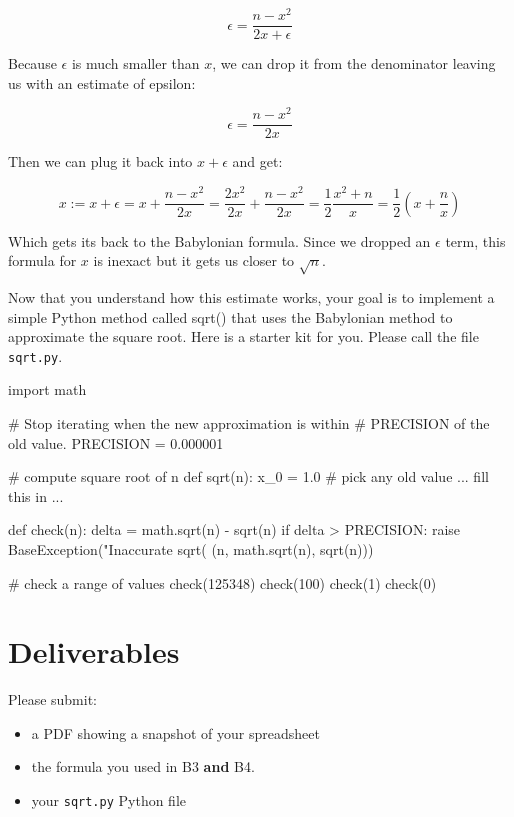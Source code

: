 \begin{fullwidth}
\[
\epsilon = \frac{n - x^2}{2x + \epsilon}
\]

Because $\epsilon$ is much smaller than $x$, we can drop it from the denominator leaving us with an estimate of epsilon:

\[
\epsilon = \frac{n - x^2}{2x}
\]

Then we can plug it back into $x + \epsilon$ and get:

\[
x := x + \epsilon = x + \frac{n - x^2}{2x} = \frac{2x^2}{2x} + \frac{n - x^2}{2x} = \frac{1}{2}\frac{x^2 + n}{x} = \frac{1}{2}(x + \frac{n}{x})
\]

Which gets its back to the Babylonian formula. Since we dropped an $\epsilon$ term, this formula for $x$ is inexact but it gets us closer to $\sqrt{n}$.


Now that you understand how this estimate works, your goal is to implement a simple Python method called sqrt() that uses the Babylonian method to approximate the square root. Here is a starter kit for you. Please call the file {\tt sqrt.py}.

\begin{pyverbatim}
import math

# Stop iterating when the new approximation is within
# PRECISION of the old value.
PRECISION = 0.000001

# compute square root of n
def sqrt(n):
    x_0 = 1.0 # pick any old value
    ... fill this in ...

def check(n):
    delta = math.sqrt(n) - sqrt(n)
    if delta > PRECISION:
        raise BaseException("Inaccurate sqrt(%
            (n, math.sqrt(n), sqrt(n)))

# check a range of values
check(125348)
check(100)
check(1)
check(0)
\end{pyverbatim}

\section{Deliverables}

Please submit:

\begin{itemize}
\item a PDF showing a snapshot of your spreadsheet
\item the formula you used in B3 {\bf and} B4.
\item your {\tt sqrt.py} Python file
\end{itemize}

\end{fullwidth}
